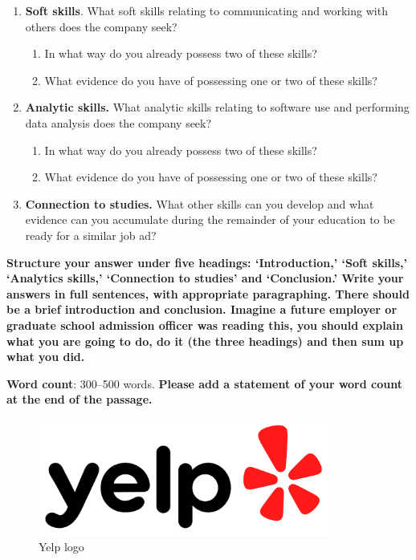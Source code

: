 \documentclass[
  openany]{book}
\begin{document}
\begin{enumerate}
\def\labelenumi{\arabic{enumi}.}
\item
  \textbf{Soft skills}. What soft skills relating to communicating and working with others does the company seek?

  \begin{enumerate}
  \def\labelenumii{\arabic{enumii}.}
  \item
    In what way do you already possess two of these skills?
  \item
    What evidence do you have of possessing one or two of these skills?
  \end{enumerate}
\item
  \textbf{Analytic skills.} What analytic skills relating to software use and performing data analysis does the company seek?

  \begin{enumerate}
  \def\labelenumii{\arabic{enumii}.}
  \item
    In what way do you already possess two of these skills?
  \item
    What evidence do you have of possessing one or two of these skills?
  \end{enumerate}
\item
  \textbf{Connection to studies.} What other skills can you develop and what evidence can you accumulate during the remainder of your education to be ready for a similar job ad?
\end{enumerate}

\textbf{Structure your answer under five headings: `Introduction,' `Soft skills,' `Analytics skills,' `Connection to studies' and `Conclusion.' Write your answers in full sentences, with appropriate paragraphing. There should be a brief introduction and conclusion. Imagine a future employer or graduate school admission officer was reading this, you should explain what you are going to do, do it (the three headings) and then sum up what you did.}

\textbf{Word count}: 300--500 words. \textbf{Please add a statement of your word count at the end of the passage.}

\begin{figure}
\centering
\includegraphics[width=3.76042in,height=\textheight]{images/assessments/Yelp_Logo.png}
\caption{Yelp logo}
\end{figure}
\end{document}
